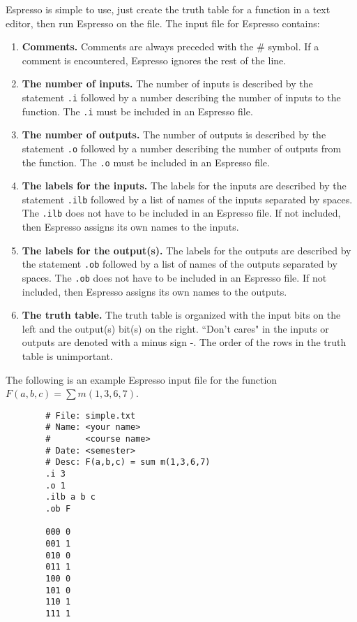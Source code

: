 Espresso is simple to use, just create the truth table for
a function in a text editor, then run Espresso on the file.
The input file for Espresso contains:
\begin{enumerate}
\item \textbf{ Comments.}  Comments are always preceded with
the \# symbol.  If a comment is encountered, Espresso
ignores the rest of the line.

\item \textbf{ The number of inputs.}
The number of inputs is
described by the statement \verb+.i+ followed by a
number describing the number of inputs to the function.
The \verb+.i+  must be included in an Espresso file.

\item \textbf{ The number of outputs.}
The number of outputs
is described by the statement \verb+.o+ followed by
a number describing the number of outputs from the function.
The \verb+.o+ must be included in an Espresso file.

\item \textbf{ The labels for the inputs.}
The labels for the inputs are described by the statement \verb+.ilb+
followed by a list of names of the inputs separated by spaces.
The \verb+.ilb+ does not have to be included in an
Espresso file.  If not included, then Espresso assigns its
own names to the inputs.

\item \textbf{ The labels for the output(s).}
The labels for the outputs are described by the statement \verb+.ob+
followed by a list of names of the outputs separated by spaces.
The \verb+.ob+ does not have to be included in an
Espresso file.  If not included, then Espresso assigns its
own names to the outputs.

\item \textbf{ The truth table.}
The truth table is organized with the input bits on the left and the
output(s) bit(s) on the right.  ``Don't cares" in the inputs or outputs
are denoted with a minus sign -.  The order of the rows in the truth
table is unimportant.

\end{enumerate}

The following is an example Espresso input file for the function
$F(a,b,c) = \sum m(1,3,6,7)$.

\begin{verbatim}
        # File: simple.txt
        # Name: <your name>
        #       <course name>
        # Date: <semester>
        # Desc: F(a,b,c) = sum m(1,3,6,7)
        .i 3
        .o 1
        .ilb a b c
        .ob F

        000 0
        001 1
        010 0
        011 1
        100 0
        101 0
        110 1
        111 1
\end{verbatim}

